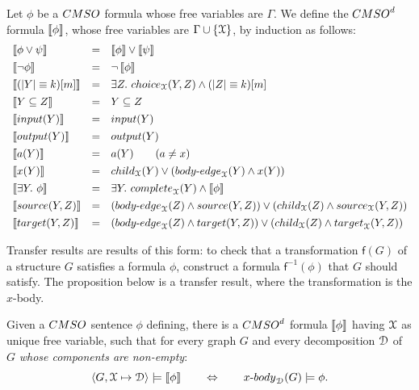 \begin{definition}\label{def:transfer}  Let $\phi$ be a $\CMSO$ formula whose free variables are $\Gamma$. 
 We define the $\CMSOd$ formula $\left\llbracket {\phi}\right\rrbracket$, whose free variables are $\Gamma\cup\left\{\mathcal X\right\}$,  by induction as follows:
 $$\begin{array}{lll}
    \tms{\phi\vee \psi}&= & \tms{\phi} \vee \tms{\psi} \\[4pt]
    \tms{\neg \phi}&= & \neg \tms{\phi}\\[4pt]
      \tms{(|Y|\equiv k)[m]}&= & \exists Z.\ \mathsf{choice}_\cX(Y,Z)\wedge (|Z|\equiv k)[m]\\[4pt]
   \tms{Y\subseteq Z}&= & Y\subseteq Z \\[4pt]
    \tms{\mathsf{input}(Y)}&= &  {\mathsf{input}(Y)}\\[4pt]
     \tms{\mathsf{output}(Y)}&= &  {\mathsf{output}(Y)}\\[4pt]
     \tms{a(Y)}&= & a(Y)\qquad (a\neq x) \\[4pt]
       \tms{x(Y)}&= & \mathsf{child}_\cX(Y) \vee (\mathsf{body\text{-}edge}_\cX(Y)\wedge x(Y) ) \\[4pt]
        \tms{\exists Y.\ \phi}&= &\exists Y.\ \mathsf{complete}_\cX(Y)\wedge \tms{\phi}\\[4pt]
 \tms{\mathsf{source}(Y,Z)}& =&(\mathsf{body\text{-}edge}_\cX(Z)\wedge \mathsf{source}(Y,Z) )\vee (\mathsf{child}_\cX(Z)\wedge \mathsf{source}_\cX(Y,Z) )\\[4pt]
 \tms{\mathsf{target}(Y,Z)}&= &(\mathsf{body\text{-}edge}_\cX(Z)\wedge \mathsf{target}(Y,Z) )\vee (\mathsf{child}_\cX(Z)\wedge \mathsf{target}_\cX(Y,Z) )
 \end{array}
 $$
 \end{definition}

Transfer results are results of this form: to check that a transformation $\mathsf{f}(G)$ of a structure $G$ satisfies a formula $\phi$, construct a formula $\mathsf{f}^{-1}(\phi)$ that $G$ should satisfy. The proposition below is a transfer result, where the transformation is the $x$-body.

 \begin{proposition}\label{prop:transfer}
Given a $\CMSO$ sentence $\phi$ defining, there is a $\CMSOd$ formula $\left\llbracket {\phi}\right\rrbracket$ having $\mathcal X$ as unique free variable, such that for every graph $G$ and every decomposition $\mathcal D$  of $G$ \emph{whose components are non-empty}:
$$\langle G,\cX\mapsto\cD\rangle \models\tms{\phi}\qquad \Leftrightarrow \qquad  \text{$x$-}\mathsf{body}_\cD(G)\models \phi.$$
\end{proposition}



